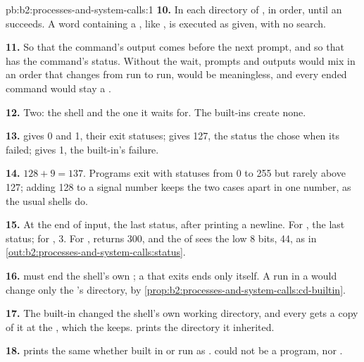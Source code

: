 \begin{solution}{pb:b2:processes-and-system-calls:1}
\textbf{10.} In each directory of , in order, until an  succeeds. A word containing a
\code{/}, like , is executed as given, with no search.

\textbf{11.} So that the command's output comes before the next prompt, and so that  has the command's
status. Without the wait, prompts and outputs would mix in an order that changes from run to run,  would be
meaningless, and every ended command would stay a .

\textbf{12.} Two: the shell and the one  it waits for. The built-ins create none.

\textbf{13.}  gives 0 and  1, their exit statuses;  gives 127, the
status the  chose when its  failed;  gives 1, the built-in's failure.

\textbf{14.} $128 + 9 = 137$. Programs exit with statuses from 0 to 255 but rarely above 127; adding 128 to a signal
number keeps the two cases apart in one number, as the usual shells do.

\textbf{15.} At the end of input, the last status, after printing a newline. For , the last status; for
, 3. For ,  returns 300, and the  of  sees the low 8 bits,
44, as in \cref{out:b2:processes-and-system-calls:status}.

\textbf{16.}  must end the shell's own ; a  that exits ends only itself. A  run in a
 would change only the 's directory, by \cref{prop:b2:processes-and-system-calls:cd-builtin}.

\textbf{17.} The built-in  changed the shell's own working directory, and every  gets a copy of it at
the , which the  keeps.  prints the directory it inherited.

\textbf{18.}  prints the same whether built in or run as .  could not be a
program, nor .


\end{solution}
